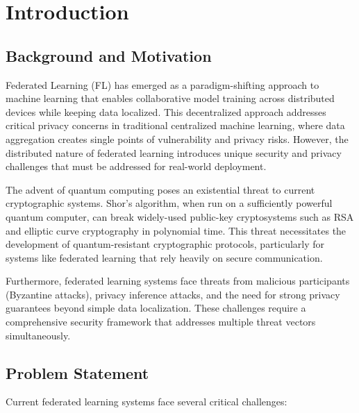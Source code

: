 \documentclass[12pt,a4paper]{article}
\begin{document}
\section{Introduction}

\subsection{Background and Motivation}

Federated Learning (FL) has emerged as a paradigm-shifting approach to machine learning that enables collaborative model training across distributed devices while keeping data localized. This decentralized approach addresses critical privacy concerns in traditional centralized machine learning, where data aggregation creates single points of vulnerability and privacy risks. However, the distributed nature of federated learning introduces unique security and privacy challenges that must be addressed for real-world deployment.

The advent of quantum computing poses an existential threat to current cryptographic systems. Shor's algorithm, when run on a sufficiently powerful quantum computer, can break widely-used public-key cryptosystems such as RSA and elliptic curve cryptography in polynomial time. This threat necessitates the development of quantum-resistant cryptographic protocols, particularly for systems like federated learning that rely heavily on secure communication.

Furthermore, federated learning systems face threats from malicious participants (Byzantine attacks), privacy inference attacks, and the need for strong privacy guarantees beyond simple data localization. These challenges require a comprehensive security framework that addresses multiple threat vectors simultaneously.

\subsection{Problem Statement}

Current federated learning systems face several critical challenges:
\end{document}
